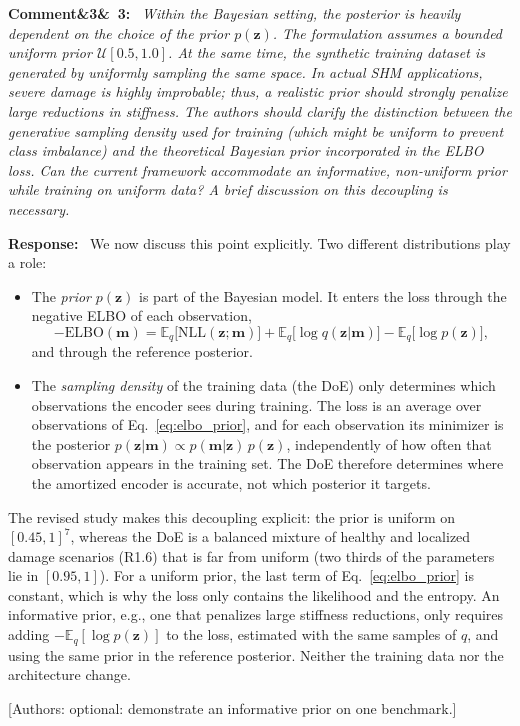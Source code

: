 \documentclass[11pt]{article}
\newenvironment{rcomment}[1]{\par\bigskip\noindent\textbf{Comment\ifx&#1&\else\ #1\fi:}\ \itshape}{\par}
\newenvironment{response}{\par\smallskip\noindent\color{resp}\textbf{Response:}\ }{\par}
\newcommand{\authornote}[1]{\textcolor{note}{\textsf{[Authors: #1]}}}
\newcommand{\m}{\mathbf{m}}
\newcommand{\z}{\mathbf{z}}
\begin{document}
\begin{rcomment}{3}
Within the Bayesian setting, the posterior is heavily dependent on the choice of the prior $p(\z)$. The formulation
assumes a bounded uniform prior $\mathcal{U}[0.5,1.0]$. At the same time, the synthetic training dataset is generated
by uniformly sampling the same space. In actual SHM applications, severe damage is highly improbable; thus, a realistic
prior should strongly penalize large reductions in stiffness. The authors should clarify the distinction between the
generative sampling density used for training (which might be uniform to prevent class imbalance) and the theoretical
Bayesian prior incorporated in the ELBO loss. Can the current framework accommodate an informative, non-uniform prior
while training on uniform data? A brief discussion on this decoupling is necessary.
\end{rcomment}

\begin{response}
We now discuss this point explicitly. Two different distributions play a
role:
\begin{itemize}[leftmargin=*]
\item The \emph{prior} $p(\z)$ is part of the Bayesian model. It enters the loss through the negative ELBO of each
observation,
\begin{equation}
-\mathrm{ELBO}(\m)=\mathbb{E}_q\big[\mathrm{NLL}(\z;\m)\big]+\mathbb{E}_q\big[\log q(\z|\m)\big]
-\mathbb{E}_q\big[\log p(\z)\big],
\label{eq:elbo_prior}
\end{equation}
and through the reference posterior.
\item The \emph{sampling density} of the training data (the DoE) only determines which observations the encoder sees
during training. The loss is an average over observations of Eq.~\eqref{eq:elbo_prior}, and for each observation its
minimizer is the posterior $p(\z|\m)\propto p(\m|\z)\,p(\z)$, independently of how often that observation appears in the
training set. The DoE therefore determines where the amortized encoder is accurate, not which posterior it targets.
\end{itemize}
The revised study makes this decoupling explicit: the prior is uniform on $[0.45,1]^7$, whereas the DoE is a balanced
mixture of healthy and localized damage scenarios (R1.6) that is far from uniform (two thirds of the parameters lie in
$[0.95,1]$). For a uniform prior, the last term of Eq.~\eqref{eq:elbo_prior} is constant, which is why the loss only
contains the likelihood and the entropy. An informative prior, e.g., one that penalizes large stiffness reductions,
only requires adding $-\mathbb{E}_q[\log p(\z)]$ to the loss, estimated with the same samples of $q$, and using the same
prior in the reference posterior. Neither the training data nor the architecture change.
\end{response}
\authornote{optional: demonstrate an informative prior on one benchmark.}
\end{document}
